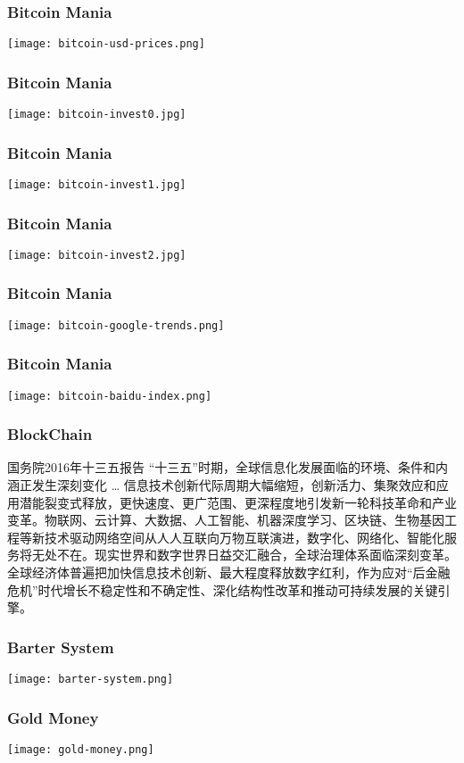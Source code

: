 \begin{frame}
    \frametitle{Bitcoin Mania}
    \texttt{[image: bitcoin-usd-prices.png]}
\end{frame}

\begin{frame}
    \frametitle{Bitcoin Mania}
    \texttt{[image: bitcoin-invest0.jpg]}
\end{frame}

\begin{frame}
    \frametitle{Bitcoin Mania}
    \texttt{[image: bitcoin-invest1.jpg]}
\end{frame}

\begin{frame}
    \frametitle{Bitcoin Mania}
    \texttt{[image: bitcoin-invest2.jpg]}
\end{frame}

\begin{frame}
    \frametitle{Bitcoin Mania}
    \texttt{[image: bitcoin-google-trends.png]}
\end{frame}

\begin{frame}
    \frametitle{Bitcoin Mania}
    \texttt{[image: bitcoin-baidu-index.png]}
\end{frame}

\begin{frame}
    \frametitle{BlockChain}
    \begin{block}{国务院2016年十三五报告}
        “十三五”时期，全球信息化发展面临的环境、条件和内涵正发生深刻变化 \ldots
        信息技术创新代际周期大幅缩短，创新活力、集聚效应和应用潜能裂变式释放，更快速度、更广范围、更深程度地引发新一轮科技革命和产业变革。物联网、云计算、大数据、人工智能、机器深度学习、\alert{区块链}、生物基因工程等新技术驱动网络空间从人人互联向万物互联演进，数字化、网络化、智能化服务将无处不在。现实世界和数字世界日益交汇融合，全球治理体系面临深刻变革。全球经济体普遍把加快信息技术创新、最大程度释放数字红利，作为应对“后金融危机”时代增长不稳定性和不确定性、深化结构性改革和推动可持续发展的关键引擎。
    \end{block}
\end{frame}

\begin{frame}
    \frametitle{Barter System}
    \texttt{[image: barter-system.png]}
\end{frame}

\begin{frame}
    \frametitle{Gold Money}
    \texttt{[image: gold-money.png]}
\end{frame}

